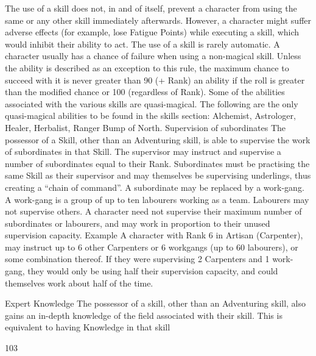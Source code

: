 \documentclass[a4paper]{article}
\begin{document}
\begin{multicols}{3}
The use of a skill does not, in and of itself, prevent
a character from using the same or any other skill
immediately afterwards. However, a character
might suffer adverse effects (for example, lose
Fatigue Points) while executing a skill, which
would inhibit their ability to act.
The use of a skill is rarely automatic.
A character usually has a chance of failure when
using a non-magical skill. Unless the ability is
described as an exception to this rule, the maximum chance to succeed with it is never greater
than 90 (+ Rank)%
an ability if the roll is greater than the modified
chance or 100 (regardless of Rank).
Some of the abilities associated with the various
skills are quasi-magical.
The following are the only quasi-magical abilities
to be found in the skills section: Alchemist, Astrologer, Healer, Herbalist, Ranger Bump of North.
Supervision of subordinates
The possessor of a Skill, other than an Adventuring
skill, is able to supervise the work of subordinates
in that Skill. The supervisor may instruct and supervise a number of subordinates equal to their
Rank. Subordinates must be practising the same
Skill as their supervisor and may themselves be
supervising underlings, thus creating a “chain of
command”. A subordinate may be replaced by a
work-gang. A work-gang is a group of up to ten
labourers working as a team. Labourers may not
supervise others. A character need not supervise
their maximum number of subordinates or labourers, and may work in proportion to their unused
supervision capacity.
Example
A character with Rank 6 in Artisan (Carpenter), may instruct up to 6 other Carpenters or 6 workgangs (up to 60 labourers), or some combination thereof.
If they were supervising 2 Carpenters and 1 work-gang,
they would only be using half their supervision capacity,
and could themselves work about half of the time.

Expert Knowledge
The possessor of a skill, other than an Adventuring
skill, also gains an in-depth knowledge of the field
associated with their skill. This is equivalent to
having Knowledge in that skill

103


\end{multicols}
\end{document}
